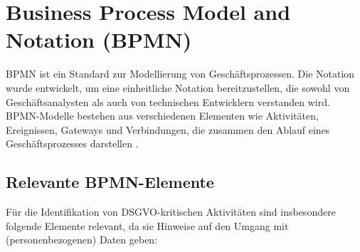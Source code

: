 \section{Business Process Model and Notation (BPMN)}\label{sec:bpmn}

\ac{BPMN} ist ein Standard zur Modellierung von Geschäftsprozessen. Die Notation wurde entwickelt, um eine einheitliche Notation bereitzustellen, die sowohl von Geschäftsanalysten als auch von technischen Entwicklern verstanden wird. \ac{BPMN}-Modelle bestehen aus verschiedenen Elementen wie Aktivitäten, Ereignissen, Gateways und Verbindungen, die zusammen den Ablauf eines Geschäftsprozesses darstellen \cite{omgbpmn}.

\subsection*{Relevante BPMN-Elemente}
Für die Identifikation von \ac{DSGVO}-kritischen Aktivitäten sind insbesondere folgende Elemente relevant, da sie Hinweise auf den Umgang mit (personenbezogenen) Daten geben:

